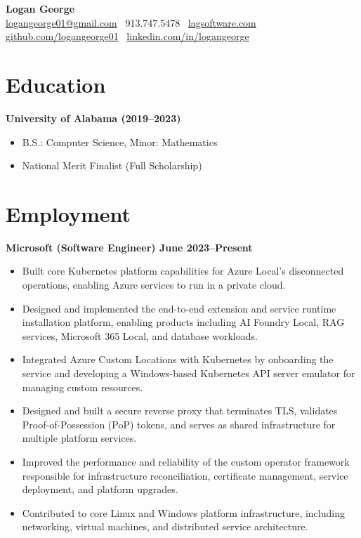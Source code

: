 \documentclass[11pt]{article}
\begin{document}
\begin{center}
    {\LARGE \textbf{Logan George}} \\[4pt]
    \href{mailto:logangeorge01@gmail.com}{logangeorge01@gmail.com} \textbar\ 913.747.5478 \textbar\ \href{https://lagsoftware.com}{lagsoftware.com} \\
    \href{https://github.com/logangeorge01}{github.com/logangeorge01} \textbar\ \href{https://linkedin.com/in/logangeorge}{linkedin.com/in/logangeorge}
\end{center}

\section{Education}

\textbf{University of Alabama (2019--2023)}
\begin{itemize}
    \item B.S.: Computer Science, Minor: Mathematics
    \item National Merit Finalist (Full Scholarship)
\end{itemize}

\section{Employment}

\textbf{Microsoft (Software Engineer) \hfill June 2023--Present}
\begin{itemize}
    \item Built core Kubernetes platform capabilities for Azure Local's disconnected operations, enabling Azure services to run in a private cloud.
    \item Designed and implemented the end-to-end extension and service runtime installation platform, enabling products including AI Foundry Local, RAG services, Microsoft 365 Local, and database workloads.
    \item Integrated Azure Custom Locations with Kubernetes by onboarding the service and developing a Windows-based Kubernetes API server emulator for managing custom resources.
    \item Designed and built a secure reverse proxy that terminates TLS, validates Proof-of-Possession (PoP) tokens, and serves as shared infrastructure for multiple platform services.
    \item Improved the performance and reliability of the custom operator framework responsible for infrastructure reconciliation, certificate management, service deployment, and platform upgrades.
    \item Contributed to core Linux and Windows platform infrastructure, including networking, virtual machines, and distributed service architecture.
\end{itemize}
\end{document}
